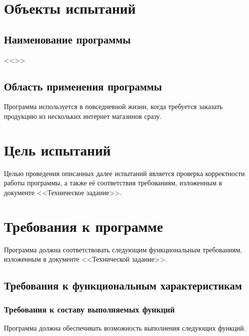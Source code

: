 \documentclass[a4paper,12pt]{article}
\begin{document}
  \CRTsign
  \CRTpreamble

  \section{Объекты испытаний}
  \subsection{Наименование программы}
  <<\CRTname>>

  \subsection{Область применения программы}
  Программа используется в повседневной жизни, когда требуется заказать продукцию из нескольких интернет магазинов сразу.

  \newpage
  \section{Цель испытаний}
  Целью проведения описанных далее испытаний является проверка корректности работы программы,
  а также её соответствия требованиям, изложенным в документе <<Техническое задание>>.

  \newpage
  \section{Требования к программе}
  Программа должна соответствовать следующим функциональным требованиям, изложенным в документе <<Технической задание>>.
  \subsection{Требования к функциональным характеристикам}
  \subsubsection{Требования к составу выполняемых функций}
  \label{sec:funcs}
  Программа должна обеспечивать возможность выполнения следующих функций.
\end{document}
